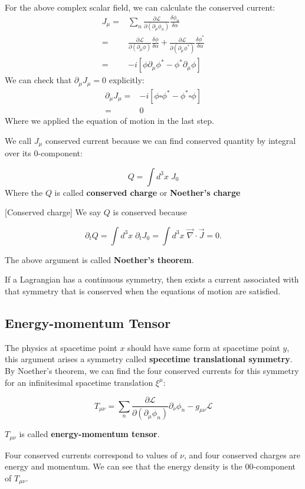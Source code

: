 \documentclass[12pt]{article}
\theoremstyle{mystyle}{\newtheorem{definition}{Definition}[subsection]}
\theoremstyle{mystyle}{\newtheorem{theorem}[definition]{Theorem}}
\theoremstyle{mystyle}{\newtheorem*{remark}{Remark}}
\theoremstyle{mystyle}{\newtheorem{example}{Example}[subsection]}
\theoremstyle{mystyle}{\newtheorem{examples}{Examples}[subsection]}
\theoremstyle{mystyle}{\newtheorem{cthm}{}[subsection]}
\begin{document}
\begin{example}
  For the above complex scalar field, we can calculate the conserved current:
  \bigskip
  \begin{align*}
    J_{\mu}= & \sum_n\frac{\partial \mathcal{L}}{\partial(\partial_\mu \phi_n)}\frac{\delta\phi_n}{\delta \alpha} \\
    =        & \frac{\partial \mathcal{L}}{\partial(\partial_\mu \phi)}\frac{\delta\phi}{\delta \alpha}
    +\frac{\partial \mathcal{L}}{\partial(\partial_\mu \phi^*)}\frac{\delta\phi^*}{\delta \alpha}                 \\
    =        & -i\left[\phi\partial_\mu\phi^*-\phi^* \partial_\mu\phi\right]
  \end{align*}
  We can check that \(\partial_\mu J_{\mu}=0\) explicitly:
  \begin{align*}
    \partial_\mu J_{\mu}= & -i\left[\phi\square\phi^*-\phi^* \square\phi\right] \\
    =                     & 0
  \end{align*}
  Where we applied the equation of motion in the last step.
\end{example}
We call \(J_\mu\) conserved current because we can find conserved quantity by integral over its 0-component:
\begin{definition}
  \[Q=\int d^3x\;J_0\]
  Where the \(Q\) is called \textbf{conserved charge} or \textbf{Noether's charge}
\end{definition}[Conserved charge]
We say \(Q\) is conserved because
\begin{cthm}
  \[\partial_tQ=\int d^3x \; \partial_t J_0 = \int d^3x\;\vec{\nabla}\cdot \vec{J} = 0.\]
\end{cthm}
The above argument is called \textbf{Noether's theorem}.
\begin{theorem}
  If a Lagrangian has a continuous symmetry,
  then exists a current associated with that symmetry that is 
  conserved when the equations of motion are satisfied.
\end{theorem}

\subsection{Energy-momentum Tensor}
The physics at spacetime point \(x\) should have same form at spacetime point \(y\),
this argument arises a symmetry called \textbf{specetime translational symmetry}.
By Noether's theorem, we can find the four conserved currents for this symmetry for an infinitesimal
spacetime translation \(\xi^\mu\):
\begin{cthm}
 \[T_{\mu\nu}=\sum_n \frac{\partial \mathcal{L}}{\partial(\partial_{\mu}\phi_n)}\partial_\nu\phi_n-g_{\mu\nu}\mathcal{L}\]
 
\(T_{\mu\nu}\) is called \textbf{energy-momentum tensor}.
\end{cthm}
Four conserved currents correspond to values of \(\nu\), and four conserved charges are energy and momentum.
We can see that the energy density is the 00-component of \(T_{\mu\nu}\).
\end{document}
